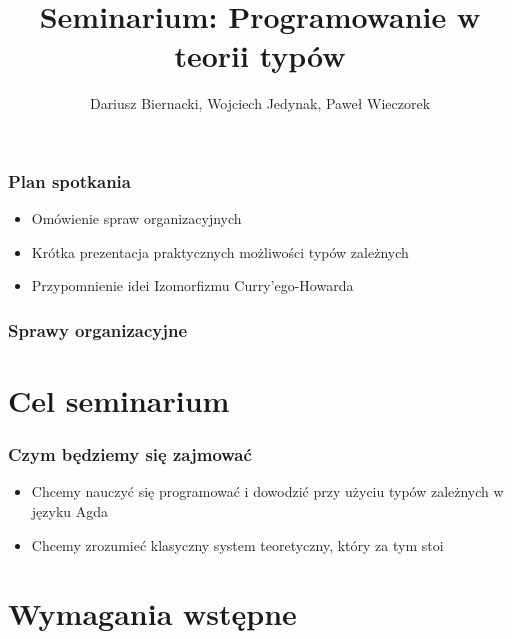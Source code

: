 \documentclass{beamer}
\title{Seminarium: Programowanie w teorii typów}
\author{Dariusz Biernacki, Wojciech Jedynak, Paweł Wieczorek}
\institute{Instytut Informatyki Uniwersytetu Wrocławskiego}
\begin{document}

\maketitle


\begin{frame}
\frametitle{Plan spotkania}

\begin{itemize}

\item Omówienie spraw organizacyjnych
\item Krótka prezentacja praktycznych możliwości typów zależnych 
\item Przypomnienie idei Izomorfizmu Curry'ego-Howarda

\end{itemize}

\end{frame}


\begin{frame}
\frametitle{Sprawy organizacyjne}

\tableofcontents[hidesubsections]

\end{frame}


\section{Cel seminarium}

\begin{frame}

\frametitle{Czym będziemy się zajmować}

\begin{itemize}
\item Chcemy nauczyć się programować i dowodzić przy użyciu typów zależnych w języku Agda
\item Chcemy zrozumieć klasyczny system teoretyczny, który za tym stoi
\end{itemize}

\end{frame}


\section{Wymagania wstępne}
\end{document}
